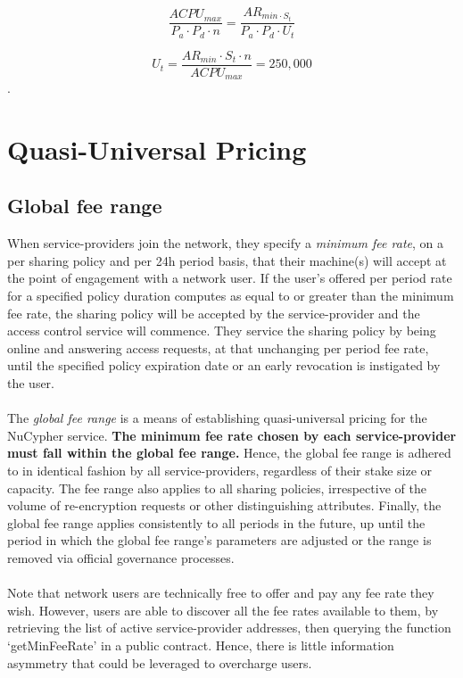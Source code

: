 \documentclass[longbibliography,nofootinbib]{revtex4-1}
\begin{document}
\begin{equation}
     \frac{ACPU_{max}}{P_a \cdot P_d \cdot n} = \frac{AR_{min \cdot S_t}}{P_a \cdot P_d \cdot U_t}
\end{equation}

\begin{equation}
     U_t = \frac{AR_{min} \cdot S_t \cdot n}{ACPU_{max}} = 250,000 
\end{equation}. \\

\section{Quasi-Universal Pricing}

\subsection{Global fee range}

When service-providers join the network, they specify a \textit{minimum fee rate}, on a per sharing policy and per 24h period basis, that their machine(s) will accept at the point of engagement with a network user. If the user’s offered per period rate for a specified policy duration computes as equal to or greater than the minimum fee rate, the sharing policy will be accepted by the service-provider and the access control service will commence. They service the sharing policy by being online and answering access requests, at that unchanging per period fee rate, until the specified policy expiration date or an early revocation is instigated by the user.
\\\\
The \textit{global fee range} is a means of establishing quasi-universal pricing for the NuCypher service. \textbf{The minimum fee rate chosen by each service-provider must fall within the global fee range.} Hence, the global fee range is adhered to in identical fashion by all service-providers, regardless of their stake size or capacity. The fee range also applies to all sharing policies, irrespective of the volume of re-encryption requests or other distinguishing attributes. Finally, the global fee range applies consistently to all periods in the future, up until the period in which the global fee range’s parameters are adjusted or the range is removed via official governance processes. 
\\\\
Note that network users are technically free to offer and pay any fee rate they wish. However, users are able to discover all the fee rates available to them, by retrieving the list of active service-provider addresses, then querying the function `getMinFeeRate' in a public contract. Hence, there is little information asymmetry that could be leveraged to overcharge users.  
\end{document}
